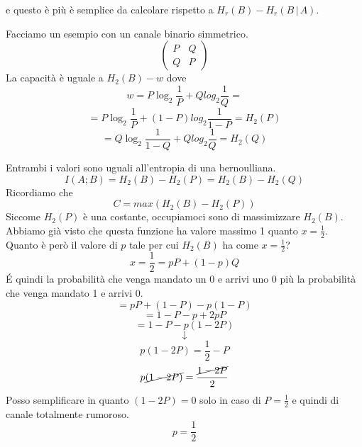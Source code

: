 e questo è più è semplice da calcolare rispetto a $H_r(B)-H_r(B\,|\,A)$.

Facciamo un esempio con un canale binario simmetrico. 
\begin{equation*}
\begin{pmatrix}
P & Q\\
Q & P
\end{pmatrix}
\end{equation*}
La capacità è uguale a $H_2(B) - w$ dove
\begin{equation*}
w = P\log_2\frac1P+Qlog_2\frac1Q = 
\end{equation*}
\begin{equation*}
= P\log_2\frac1P+(1-P)log_2\frac{1}{1-P} = H_2(P)
\end{equation*}
\begin{equation*}
= Q\log_2\frac{1}{1-Q}+Qlog_2\frac{1}{Q} = H_2(Q)
\end{equation*}

Entrambi i valori sono uguali all'entropia di una bernoulliana.
\begin{equation*}
I(A;B)=H_2(B) - H_2(P)=H_2(B) - H_2(Q)
\end{equation*}
Ricordiamo che
\begin{equation*}
C=max(H_2(B)-H_2(P))
\end{equation*}
Siccome $H_2(P)$ è una costante, occupiamoci sono di massimizzare $H_2(B)$. Abbiamo già visto che questa funzione ha valore massimo 1 quanto $x=\frac12$. Quanto è però il valore di $p$ tale per cui $H_2(B)$ ha come $x=\frac12$?
\begin{equation*}
x = \frac12 = pP + (1-p)Q
\end{equation*}
\'E quindi la probabilità che venga mandato un 0 e arrivi uno 0 più la probabilità che venga mandato 1 e arrivi 0.
\begin{equation*}
= pP + (1-P)-p(1-P)
\end{equation*}
\begin{equation*}
 = 1-P-p + 2pP
\end{equation*}
\begin{equation*}
= 1 - P - p(1 - 2P)
\end{equation*}
\begin{equation*}
\downarrow
\end{equation*}
\begin{equation*}
p(1-2P) = \frac12 - P
\end{equation*}
\begin{equation*}
p\cancel{(1-2P)} = \frac{\cancel{1-2P}}{2}
\end{equation*}
Posso semplificare in quanto $(1-2P) = 0$ solo in caso di $P=\frac12$ e quindi di canale totalmente rumoroso.
\begin{equation*}
p = \frac{1}{2}
\end{equation*}

